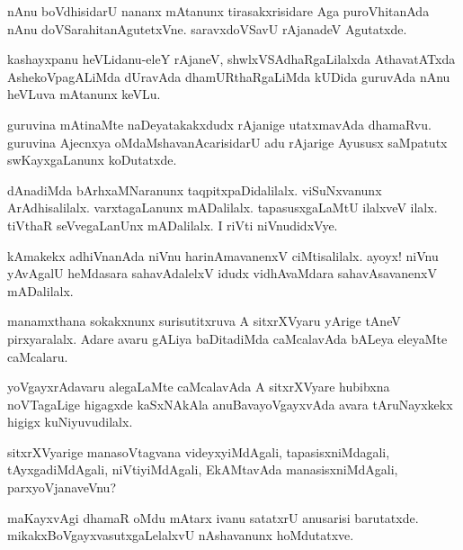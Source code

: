 \documentclass{article}
\begin{document}
\begin{mn}%
nAnu boVdhisidarU nananx mAtanunx tirasakxrisidare Aga puroVhitanAda nAnu 
doVSarahitanAgutetxVne. saravxdoVSavU rAjanadeV Agutatxde.
\end{mn}

\begin{mn}%
kashayxpanu heVLidanu-eleY rAjaneV, shwlxVSAdhaRgaLilalxda AthavatATxda AshekoVpagALiMda 
dUravAda dhamURthaRgaLiMda kUDida guruvAda nAnu heVLuva mAtanunx keVLu.
\end{mn}

\begin{mn}%
guruvina mAtinaMte naDeyatakakxdudx rAjanige utatxmavAda dhamaRvu. guruvina Ajecnxya 
oMdaMshavanAcarisidarU adu rAjarige Ayususx saMpatutx  swKayxgaLanunx koDutatxde.
\end{mn}

\begin{mn}%
dAnadiMda bArhxaMNaranunx taqpitxpaDidalilalx. viSuNxvanunx ArAdhisalilalx. varxtagaLanunx 
mADalilalx. tapasusxgaLaMtU ilalxveV ilalx. tiVthaR seVvegaLanUnx mADalilalx. I riVti 
niVnudidxVye.
\end{mn}

\begin{mn}%
kAmakekx adhiVnanAda niVnu harinAmavanenxV ciMtisalilalx. ayoyx! niVnu yAvAgalU heMdasara 
sahavAdalelxV idudx vidhAvaMdara sahavAsavanenxV mADalilalx.
\end{mn}

\begin{mn}%
manamxthana sokakxnunx surisutitxruva A sitxrXVyaru yArige tAneV pirxyaralalx. Adare avaru
gALiya baDitadiMda caMcalavAda bALeya eleyaMte caMcalaru.
\end{mn}

\begin{mn}%
yoVgayxrAdavaru alegaLaMte caMcalavAda A sitxrXVyare hubibxna noVTagaLige higagxde 
kaSxNAkAla anuBavayoVgayxvAda avara tAruNayxkekx higigx kuNiyuvudilalx.
\end{mn}

\begin{mn}%
sitxrXVyarige manasoVtagvana videyxyiMdAgali, tapasisxniMdagali, tAyxgadiMdAgali, 
niVtiyiMdAgali, EkAMtavAda manasisxniMdAgali, parxyoVjanaveVnu?
\end{mn}

\begin{mn}%
maKayxvAgi dhamaR oMdu mAtarx ivanu satatxrU anusarisi barutatxde. 
mikakxBoVgayxvasutxgaLelalxvU nAshavanunx hoMdutatxve.
\end{mn}
\end{document}

